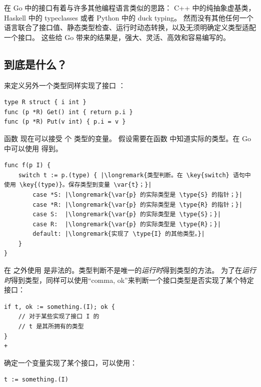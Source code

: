 在 Go 中的接口有着与许多其他编程语言类似的思路：
C++ 中的纯抽象虚基类，Haskell 中的 typeclasses 或者 Python 中的 duck typing。
然而没有其他任何一个语言联合了接口值、静态类型检查、运行时动态转换，以及无须明确定义类型适配一个接口。
这些给 Go 带来的结果是，强大、灵活、高效和容易编写的。

\subsection{到底是什么？}
来定义另外一个类型同样实现了接口 ：
\begin{lstlisting}
type R struct { i int }
func (p *R) Get() int { return p.i }
func (p *R) Put(v int) { p.i = v }
\end{lstlisting}
函数  现在可以接受  个  类型的变量。
假设需要在函数  中知道实际的类型。在 Go 中可以使用
  得到。

\begin{lstlisting}
func f(p I) {
    switch t := p.(type) { |\longremark{类型判断。在 \key{switch} 语句中使用 \key{(type)}。保存类型到变量 \var{t}；}|
        case *S: |\longremark{\var{p} 的实际类型是 \type{S} 的指针；}|
        case *R: |\longremark{\var{p} 的实际类型是 \type{R} 的指针；}|
        case S:  |\longremark{\var{p} 的实际类型是 \type{S}；}|
        case R:  |\longremark{\var{p} 的实际类型是 \type{R}；}|
        default: |\longremark{实现了 \type{I} 的其他类型。}|
    }
}
\end{lstlisting}
\showremarks
在  之外使用  是非法的。类型判断不是唯一的\emph{运行时}得到类型的方法。
为了在\emph{运行时}得到类型，同样可以使用``comma, ok''来判断一个接口类型是否实现了某个特定接口：

\begin{lstlisting}
if t, ok := something.(I); ok {
    // 对于某些实现了接口 I 的
    // t 是其所拥有的类型
} 
+\end{lstlisting}
确定一个变量实现了某个接口，可以使用：
\begin{lstlisting}
t := something.(I)
\end{lstlisting}


